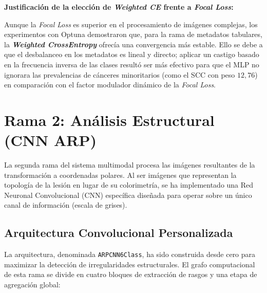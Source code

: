 \textbf{Justificación de la elección de \textit{Weighted CE} frente a \textit{Focal Loss}:}

Aunque la \textit{Focal Loss} es superior en el procesamiento de imágenes complejas, los experimentos con Optuna demostraron que, para la rama de metadatos tabulares, la \textbf{\textit{Weighted CrossEntropy}} ofrecía una convergencia más estable. Ello se debe a que el desbalanceo en los metadatos es lineal y directo; aplicar un castigo basado en la frecuencia inversa de las clases resultó ser más efectivo para que el MLP no ignorara las prevalencias de cánceres minoritarios (como el SCC con peso $12,76$) en comparación con el factor modulador dinámico de la \textit{Focal Loss}.

\section{Rama 2: Análisis Estructural (CNN ARP)}

La segunda rama del sistema multimodal procesa las imágenes resultantes de la transformación a coordenadas polares. Al ser imágenes que representan la topología de la lesión en lugar de su colorimetría, se ha implementado una Red Neuronal Convolucional (CNN) específica diseñada para operar sobre un único canal de información (escala de grises).

\subsection{Arquitectura Convolucional Personalizada}

La arquitectura, denominada \texttt{ARPCNN6Class}, ha sido construida desde cero para maximizar la detección de irregularidades estructurales. El grafo computacional de esta rama se divide en cuatro bloques de extracción de rasgos y una etapa de agregación global:



